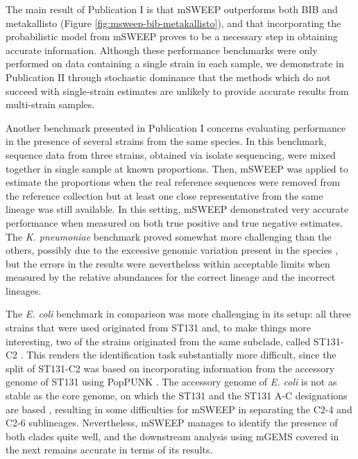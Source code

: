 \documentclass[officiallayout]{tktla}
\begin{document}
The main result of Publication I is that mSWEEP outperforms both BIB
and metakallisto (Figure \ref{fig:msweep-bib-metakallisto}), and that
incorporating the probabilistic model from mSWEEP proves to be a
necessary step in obtaining accurate information. Although these
performance benchmarks were only performed on data containing a single
strain in each sample, we demonstrate in Publication II through
stochastic dominance \citep{hadar1969rules, bawa1975optimal} that the
methods which do not succeed with single-strain estimates are unlikely
to provide accurate results from multi-strain samples.

Another benchmark presented in Publication I concerns evaluating
performance in the presence of several strains from the same
species. In this benchmark, sequence data from three strains, obtained
via isolate sequencing, were mixed together in single sample at known
proportions. Then, mSWEEP was applied to estimate the proportions when
the real reference sequences were removed from the reference
collection but at least one close representative from the same lineage
was still available. In this setting, mSWEEP demonstrated very
accurate performance when measured on both true positive and true
negative estimates. The \textit{K. pneumoniae} benchmark proved
somewhat more challenging than the others, possibly due to the
excessive genomic variation present in the species
\citep{wyres2016klebsiella}, but the errors in the results were
nevertheless within acceptable limits when measured by the relative
abundances for the correct lineage and the incorrect lineages.

The \textit{E. coli} benchmark in comparison was more challenging in
its setup: all three strains that were used originated from ST131 and,
to make things more interesting, two of the strains originated from
the same subclade, called ST131-C2
\citep{kallonen2017systematic}. This renders the identification task
substantially more difficult, since the split of ST131-C2 was based on
incorporating information from the accessory genome of ST131 using
PopPUNK \citep{lees2019fast}. The accessory genome of \textit{E. coli}
is not as stable as the core genome, on which the
ST131 and the ST131 A-C designations are based \citep{kallonen2017systematic},
resulting in some difficulties for mSWEEP in separating the C2-4 and
C2-6 sublineages. Nevertheless, mSWEEP manages to identify the
presence of both clades quite well, and the downstream analysis using
mGEMS covered in the next remains accurate in terms of its results.
\end{document}
